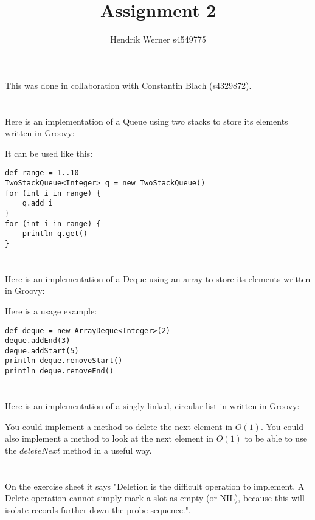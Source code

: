 \documentclass[12pt]{article}
\title {Assignment 2}
\author {Hendrik Werner s4549775}
\begin{document}
\maketitle

This was done in collaboration with Constantin Blach (s4329872).

\section{} %
Here is an implementation of a Queue using two stacks to store its elements written in Groovy:



It can be used like this:

\begin{lstlisting}
def range = 1..10
TwoStackQueue<Integer> q = new TwoStackQueue()
for (int i in range) {
    q.add i
}
for (int i in range) {
    println q.get()
}
\end{lstlisting}

\section{} %
Here is an implementation of a Deque using an array to store its elements written in Groovy:



Here is a usage example:

\begin{lstlisting}
def deque = new ArrayDeque<Integer>(2)
deque.addEnd(3)
deque.addStart(5)
println deque.removeStart()
println deque.removeEnd()
\end{lstlisting}

\section{} %
Here is an implementation of a singly linked, circular list in written in Groovy:



You could implement a method to delete the next element in $O(1)$. You could also implement a method to look at the next element in $O(1)$ to be able to use the $deleteNext$ method in a useful way.

\section{} %
On the exercise sheet it says "Deletion is the difficult operation to implement. A Delete operation cannot simply mark a slot as empty (or NIL), because this will isolate records further down the probe sequence.".
\end{document}
